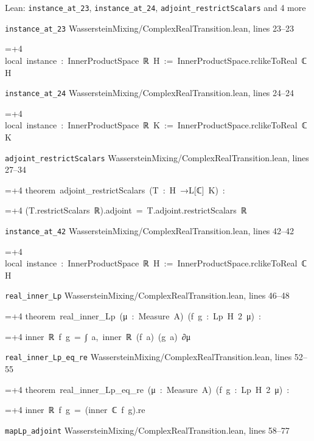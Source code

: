 \documentclass[11pt,a4paper]{article}
\newlength{\leancharwidth}
\newenvironment{leancode}{\par\smallskip\begingroup\ttfamily\footnotesize\raggedright
  \settowidth{\leancharwidth}{M}\setlength{\parskip}{0pt}\setlength{\parindent}{0pt}
  \frenchspacing}{\par\endgroup\smallskip}
\newcommand{\leanline}[2]{\hangindent=\dimexpr#1\leancharwidth+4\leancharwidth\relax
  \hangafter=1\noindent\hspace*{#1\leancharwidth}#2\par}
\newcommand{\leansource}[1]{\par{\footnotesize\color{leanmuted}#1}\par}
\begin{document}
\begin{leanbox}{Lean: \texttt{instance\_\allowbreak{}at\_\allowbreak{}23}, \texttt{instance\_\allowbreak{}at\_\allowbreak{}24}, \texttt{adjoint\_\allowbreak{}restrictScalars} and 4 more}
\leansource{\texttt{instance\_\allowbreak{}at\_\allowbreak{}23} \quad WassersteinMixing/\allowbreak{}ComplexRealTransition.lean, lines 23–23}
\begin{leancode}
\leanline{0}{local\ instance\ :\ InnerProductSpace\ ℝ\ H\ :=\ InnerProductSpace.rclikeToReal\ ℂ\ H}
\end{leancode}
\leansource{\texttt{instance\_\allowbreak{}at\_\allowbreak{}24} \quad WassersteinMixing/\allowbreak{}ComplexRealTransition.lean, lines 24–24}
\begin{leancode}
\leanline{0}{local\ instance\ :\ InnerProductSpace\ ℝ\ K\ :=\ InnerProductSpace.rclikeToReal\ ℂ\ K}
\end{leancode}
\leansource{\texttt{adjoint\_\allowbreak{}restrictScalars} \quad WassersteinMixing/\allowbreak{}ComplexRealTransition.lean, lines 27–34}
\begin{leancode}
\leanline{0}{theorem\ adjoint\_restrictScalars\ (T\ :\ H\ →L[ℂ]\ K)\ :}
\leanline{4}{(T.restrictScalars\ ℝ).adjoint\ =\ T.adjoint.restrictScalars\ ℝ}
\end{leancode}
\leansource{\texttt{instance\_\allowbreak{}at\_\allowbreak{}42} \quad WassersteinMixing/\allowbreak{}ComplexRealTransition.lean, lines 42–42}
\begin{leancode}
\leanline{0}{local\ instance\ :\ InnerProductSpace\ ℝ\ H\ :=\ InnerProductSpace.rclikeToReal\ ℂ\ H}
\end{leancode}
\leansource{\texttt{real\_\allowbreak{}inner\_\allowbreak{}Lp} \quad WassersteinMixing/\allowbreak{}ComplexRealTransition.lean, lines 46–48}
\begin{leancode}
\leanline{0}{theorem\ real\_inner\_Lp\ (μ\ :\ Measure\ A)\ (f\ g\ :\ Lp\ H\ 2\ μ)\ :}
\leanline{4}{inner\ ℝ\ f\ g\ =\ ∫\ a,\ inner\ ℝ\ (f\ a)\ (g\ a)\ ∂μ}
\end{leancode}
\leansource{\texttt{real\_\allowbreak{}inner\_\allowbreak{}Lp\_\allowbreak{}eq\_\allowbreak{}re} \quad WassersteinMixing/\allowbreak{}ComplexRealTransition.lean, lines 52–55}
\begin{leancode}
\leanline{0}{theorem\ real\_inner\_Lp\_eq\_re\ (μ\ :\ Measure\ A)\ (f\ g\ :\ Lp\ H\ 2\ μ)\ :}
\leanline{4}{inner\ ℝ\ f\ g\ =\ (inner\ ℂ\ f\ g).re}
\end{leancode}
\leansource{\texttt{mapLp\_\allowbreak{}adjoint} \quad WassersteinMixing/\allowbreak{}ComplexRealTransition.lean, lines 58–77}

\end{leanbox}
\end{document}
